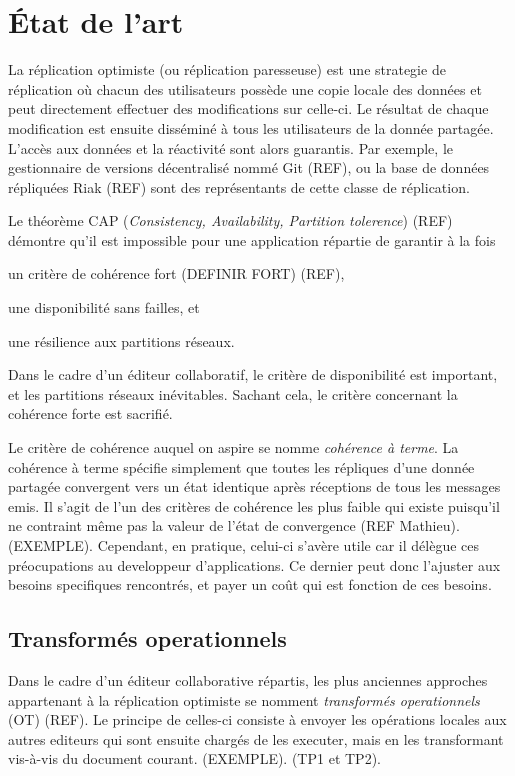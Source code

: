 \section{État de l'art}
\label{sec:relatedwork}


La réplication optimiste (ou réplication paresseuse) est une strategie de
réplication où chacun des utilisateurs possède une copie locale des données et
peut directement effectuer des modifications sur celle-ci. Le résultat de
chaque modification est ensuite disséminé à tous les utilisateurs de la donnée
partagée. L'accès aux données et la réactivité sont alors guarantis. Par
exemple, le gestionnaire de versions décentralisé nommé Git (REF), ou la base
de données répliquées Riak (REF) sont des représentants de cette classe de
réplication.

Le théorème CAP (\emph{Consistency, Availability, Partition tolerence}) (REF)
démontre qu'il est impossible pour une application répartie de garantir à la
fois
\begin{inparaenum}[(i)]
\item un critère de cohérence fort (DEFINIR FORT) (REF),
\item une disponibilité sans failles, et
\item une résilience aux partitions réseaux.
\end{inparaenum}
Dans le cadre d'un éditeur collaboratif, le critère de disponibilité est
important, et les partitions réseaux inévitables. Sachant cela, le critère
concernant la cohérence forte est sacrifié.

Le critère de cohérence auquel on aspire se nomme \emph{cohérence à terme}. La
cohérence à terme spécifie simplement que toutes les répliques d'une donnée
partagée convergent vers un état identique après réceptions de tous les
messages emis. Il s'agit de l'un des critères de cohérence les plus faible qui
existe puisqu'il ne contraint même pas la valeur de l'état de convergence (REF
Mathieu). (EXEMPLE). Cependant, en pratique, celui-ci s'avère utile car il
délègue ces préocupations au developpeur d'applications. Ce dernier peut donc
l'ajuster aux besoins specifiques rencontrés, et payer un coût qui est fonction
de ces besoins.


\subsection{Transformés operationnels}
Dans le cadre d'un éditeur collaborative répartis, les plus anciennes approches
appartenant à la réplication optimiste se nomment \emph{transformés
  operationnels} (OT) (REF). Le principe de celles-ci consiste à envoyer les
opérations locales aux autres editeurs qui sont ensuite chargés de les
executer, mais en les transformant vis-à-vis du document courant. (EXEMPLE).
(TP1 et TP2).

